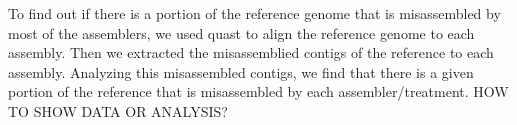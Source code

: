 To find out if there is a portion of the reference genome that is misassembled by most of the assemblers, we used quast \cite{quast} to align the reference genome to each assembly. Then we extracted the misassemblied contigs of the reference to each assembly. Analyzing this misassembled contigs, we find that there is a given portion of the reference that is misassembled by each assembler/treatment. HOW TO SHOW DATA OR ANALYSIS?  

% 
%
%
%
%
%
   
